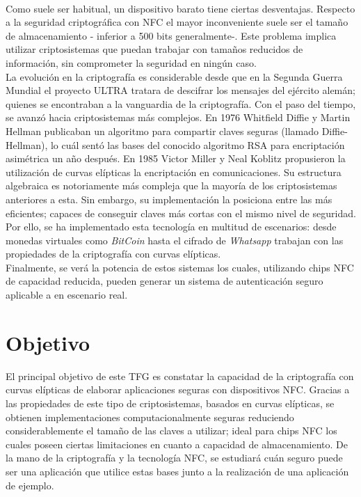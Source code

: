 \documentclass[../PFC.tex]{subfiles}
\begin{document}
\*
\vspace{0.5515cm}
\\
Como suele ser habitual, un dispositivo barato tiene ciertas desventajas. Respecto a la seguridad criptográfica con NFC el mayor inconveniente suele ser el tamaño de almacenamiento - inferior a 500 bits generalmente-. Este problema implica utilizar criptosistemas que puedan trabajar con tamaños reducidos de información, sin comprometer la seguridad en ningún caso.
\*
\vspace{0.5515cm}
\\
La evolución en la criptografía es considerable desde que en la Segunda Guerra Mundial el proyecto ULTRA tratara de descifrar los mensajes del ejército alemán; quienes se encontraban a la vanguardia de la criptografía. Con el paso del tiempo, se avanzó hacia criptosistemas más complejos. En 1976 Whitfield Diffie y Martin Hellman publicaban un algoritmo para compartir claves seguras (llamado Diffie-Hellman)\cite{diffie1976new}, lo cuál sentó las bases del conocido algoritmo RSA \cite{rivest1978method} para encriptación asimétrica un año después. En 1985 Victor Miller y Neal Koblitz propusieron la utilización de curvas elípticas la encriptación en comunicaciones. Su estructura algebraica es notoriamente más compleja que la mayoría de los criptosistemas anteriores a esta. Sin embargo, su implementación la posiciona entre las más eficientes; capaces de conseguir claves más cortas con el mismo nivel de seguridad\cite{lucena}. Por ello, se ha implementado esta tecnología en multitud de escenarios: desde monedas virtuales como \textit{BitCoin} hasta el cifrado de \textit{Whatsapp}\cite{whatsappEncryption} trabajan con las propiedades de la criptografía con curvas elípticas.
\*
\vspace{0.5515cm}
\\
Finalmente, se verá la potencia de estos sistemas los cuales, utilizando chips NFC de capacidad reducida, pueden generar un sistema de autenticación seguro aplicable a en escenario real.

\section{Objetivo}
\label{Objetivo}

El principal objetivo de este TFG es constatar la capacidad de la criptografía con curvas elípticas de elaborar aplicaciones seguras con dispositivos NFC. Gracias a las propiedades de este tipo de criptosistemas, basados en curvas elípticas, se obtienen implementaciones computacionalmente seguras reduciendo considerablemente el tamaño de las claves a utilizar; ideal para chips NFC los cuales poseen ciertas limitaciones en cuanto a capacidad de almacenamiento. De la mano de la criptografía y la tecnología NFC, se estudiará cuán seguro puede ser una aplicación que utilice estas bases junto a la realización de una aplicación de ejemplo.
\end{document}
